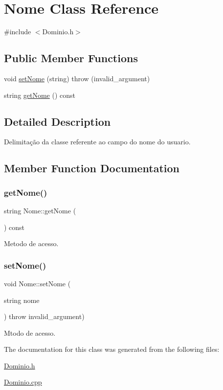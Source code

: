 \hypertarget{class_nome}{}\section{Nome Class Reference}
\label{class_nome}


{\ttfamily \#include $<$Dominio.\+h$>$}

\subsection*{Public Member Functions}
\begin{DoxyCompactItemize}
\item 
void \hyperlink{class_nome_ab1507b81047efb89b50b6be0d33c08e5}{set\+Nome} (string)  throw (invalid\+\_\+argument)
\item 
string \hyperlink{class_nome_a1c08f5b9827a1e97a2631196ff99fdef}{get\+Nome} () const
\end{DoxyCompactItemize}


\subsection{Detailed Description}
Delimitação da classe referente ao campo do nome do usuario. 

\subsection{Member Function Documentation}
\mbox{\label{class_nome_a1c08f5b9827a1e97a2631196ff99fdef}} 
\subsubsection{\texorpdfstring{get\+Nome()}{getNome()}}
{\footnotesize\ttfamily string Nome\+::get\+Nome (\begin{DoxyParamCaption}{ }\end{DoxyParamCaption}) const\hspace{0.3cm}{\ttfamily [inline]}}

Metodo de acesso. \mbox{\label{class_nome_ab1507b81047efb89b50b6be0d33c08e5}} 
\subsubsection{\texorpdfstring{set\+Nome()}{setNome()}}
{\footnotesize\ttfamily void Nome\+::set\+Nome (\begin{DoxyParamCaption}\item[{string}]{nome }\end{DoxyParamCaption}) throw  invalid\+\_\+argument) }

Mtodo de acesso. 

The documentation for this class was generated from the following files\+:\begin{DoxyCompactItemize}
\item 
\hyperlink{_dominio_8h}{Dominio.\+h}\item 
\hyperlink{_dominio_8cpp}{Dominio.\+cpp}\end{DoxyCompactItemize}
